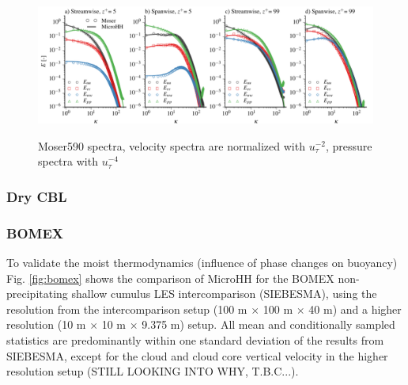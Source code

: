 \documentclass[gmd]{copernicus}
\begin{document}
\begin{figure}[t]
\vspace*{2mm}
\begin{center}
\includegraphics[width=16.6cm]{figs/gmd_m590_spectra_4x1.pdf}\label{fig:moser_spectra}
\end{center}
\caption{Moser590 spectra, velocity spectra are normalized with $u_\tau^{-2}$, pressure spectra with $u_\tau^{-4}$}
\end{figure}

\subsubsection{Dry CBL}

\subsubsection{BOMEX}

To validate the moist thermodynamics (influence of phase changes on buoyancy) Fig. \ref{fig:bomex} shows the comparison of MicroHH for the BOMEX non-precipitating shallow cumulus LES intercomparison (SIEBESMA), using the resolution from the intercomparison setup (100 m $\times$ 100 m $\times$ 40 m) and a higher resolution (10 m $\times$ 10 m $\times$ 9.375 m) setup. All mean and conditionally sampled statistics are predominantly within one standard deviation of the results from SIEBESMA, except for the cloud and cloud core vertical velocity in the higher resolution setup (STILL LOOKING INTO WHY, T.B.C...). 
\end{document}
